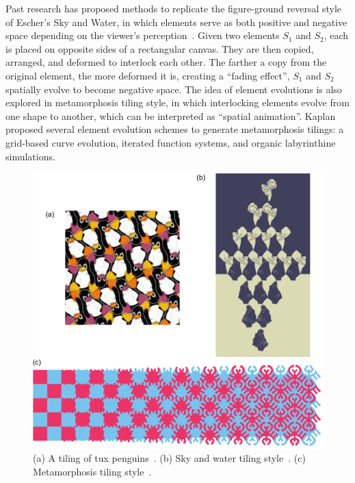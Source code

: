 
\nnewtext
{
Past research has proposed methods
to replicate the figure-ground reversal style of Escher's Sky and Water,
in which elements serve as both positive and negative space depending 
on the viewer's perception~\cite{Kaplan2004, Sugihara2009, Lin2018}.
Given two elements $S_1$ and $S_2$, each is placed on opposite sides of a rectangular canvas.
They are then copied, arranged, and deformed to interlock each other.
The farther a copy from the original element, the more deformed it is, 
creating a ``fading effect'', $S_1$ and $S_2$ spatially evolve to become negative space.
The idea of element evolutions is also explored in metamorphosis tiling style,
in which interlocking elements evolve from one shape to another,
which can be interpreted as ``spatial animation''.
Kaplan~\cite{Kaplan2010} proposed several element evolution schemes to generate metamorphosis tilings:
a grid-based curve evolution, iterated function systems, and organic labyrinthine simulations.
}

\begin{figure}
\centering
\includegraphics[width=1.0\textwidth]{figures/related/tilings.pdf} 
\caption[Tilings]
{\label{fig_related_escherization} 
\nnewtext
{
(a) A tiling of tux penguins~\cite{Kaplan2000}.
(b) Sky and water tiling style~\cite{Kaplan2004}.
(c) Metamorphosis tiling style~\cite{Kaplan2010}.
}
}
\end{figure}

